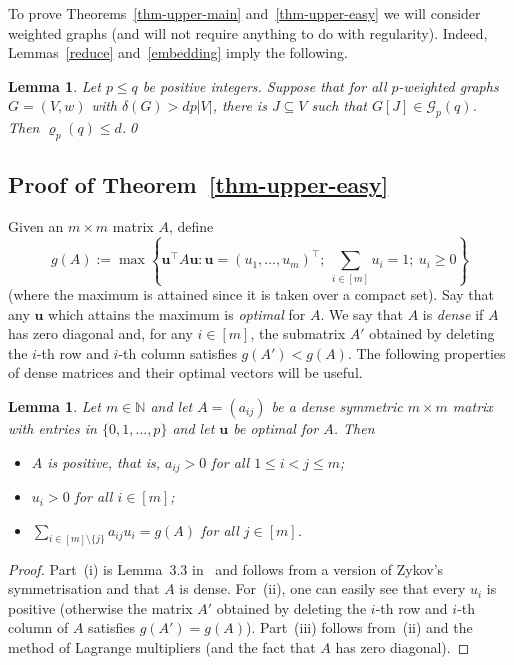 \documentclass[10pt,a4paper]{article}
\newtheorem{lemma}[theorem]{Lemma}
\theoremstyle{definition}
\newcommand{\cG}{\mathcal{G}}
\begin{document}
To prove Theorems~\ref{thm-upper-main} and~\ref{thm-upper-easy} we will consider weighted graphs (and will not require anything to do with regularity). Indeed, Lemmas~\ref{reduce} and~\ref{embedding} imply the following.

\begin{lemma}\label{lem:summary}
	Let $p \leq q$ be positive integers.
	Suppose that for all $p$-weighted graphs $G=(V,w)$ with $\delta(G) > dp|V|$, there is $J \subseteq V$ such that $G[J] \in \cG_p(q)$. Then $\varrho_p(q) \leq d$.\qed
\end{lemma}


\subsection{Proof of Theorem~\ref{thm-upper-easy}}\label{sec-upper-easy}

Given an $m\times m$ matrix $A$, define
$$
g(A) := \textstyle{\max\left\lbrace \bm{u}^\intercal A\bm{u}: \bm{u} = (u_1,\ldots,u_m)^\intercal;~ \sum_{i \in [m]}u_i=1;~ u_i \geq 0\right\rbrace}
$$
(where the maximum is attained since it is taken over a compact set). Say that any $\bm{u}$ which attains the maximum is \emph{optimal} for $A$.
We say that $A$ is \emph{dense} if $A$ has zero diagonal and, for any $i \in [m]$, the submatrix $A'$ obtained by deleting the $i$-th row and $i$-th column
satisfies $g(A') < g(A)$. The following properties of dense matrices and their optimal vectors will be useful.

\begin{lemma}\label{sym}
	Let $m \in \mathbb{N}$ and let $A = (a_{ij})$ be a dense symmetric $m\times m$ matrix with entries in $\lbrace 0,1,\ldots,p\rbrace$ and let $\bm{u}$ be optimal for $A$.
	Then
	\begin{itemize}
		\item[(i)] $A$ is positive, that is, $a_{ij}>0$ for all $1\le i<j\le m$;
		\item[(ii)] $u_i>0$ for all $i \in [m]$;
		\item[(iii)] $\sum_{i \in [m]\setminus\lbrace j \rbrace}a_{ij}u_i = g(A)$ for all $j \in [m]$.
	\end{itemize}
\end{lemma}

\begin{proof}
	Part~(i) is Lemma~3.3 in~\cite{EHSSSz} and follows from a version of Zykov's symmetrisation and that $A$ is dense. For~(ii), one can easily see that every $u_i$ is positive (otherwise the matrix $A'$ obtained by deleting the $i$-th row and $i$-th column of $A$ satisfies $g(A')=g(A)$).
	Part~(iii) follows from~(ii) and the method of Lagrange multipliers (and the fact that $A$ has zero diagonal).
\end{proof}
\end{document}
